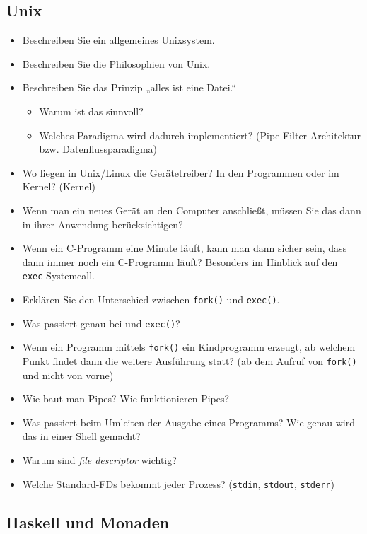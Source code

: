 \documentclass[
  a4paper,
  11pt,
]{article}
\title{}
\author{}
\begin{document}
\thispagestyle{fancy}

\subsection*{Unix}
\label{sub:Unix}

\begin{itemize}
  \item Beschreiben Sie ein allgemeines Unixsystem.
  \item Beschreiben Sie die Philosophien von Unix.
  \item Beschreiben Sie das Prinzip „alles ist eine Datei.“
    \begin{itemize}
      \item Warum ist das sinnvoll?
      \item Welches Paradigma wird dadurch implementiert?
        (Pipe-Filter-Architektur bzw. Datenflussparadigma)
    \end{itemize}
  \item Wo liegen in Unix/Linux die Gerätetreiber? In den Programmen oder im
    Kernel? (Kernel)
  \item Wenn man ein neues Gerät an den Computer anschließt, müssen Sie das dann
    in ihrer Anwendung berücksichtigen?
  \item Wenn ein C-Programm eine Minute läuft, kann man dann sicher sein, dass
    dann immer noch ein C-Programm läuft? Besonders im Hinblick auf den
    \texttt{exec}-Systemcall.
  \item Erklären Sie den Unterschied zwischen \texttt{fork()} und
    \texttt{exec()}.
  \item Was passiert genau bei  und \texttt{exec()}?
  \item Wenn ein Programm mittels \texttt{fork()} ein Kindprogramm erzeugt, ab
    welchem Punkt findet dann die weitere Ausführung statt? (ab dem Aufruf von
    \texttt{fork()} und nicht von vorne)
  \item Wie baut man Pipes? Wie funktionieren Pipes?
  \item Was passiert beim Umleiten der Ausgabe eines Programms? Wie genau wird
    das in einer Shell gemacht?
  \item Warum sind \textit{file descriptor} wichtig?
  \item Welche Standard-FDs bekommt jeder Prozess? (\texttt{stdin},
    \texttt{stdout}, \texttt{stderr})
\end{itemize}

\subsection*{Haskell und Monaden}
\label{sub:Haskell und Monaden}
\end{document}
